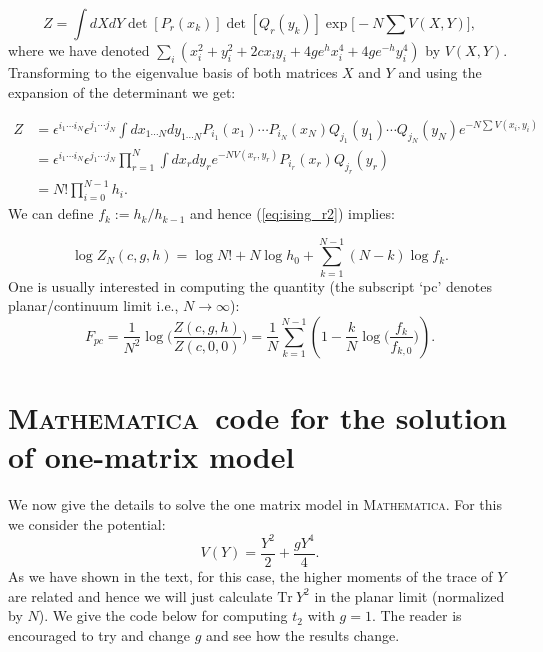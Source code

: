 \documentclass[11pt]{article}
\newcommand{\MA}{\textsc{Mathematica}}
\begin{document}
\begin{equation}
	Z = \int dX dY \det[P_{r}(x_k)] \det[Q_{r}(y_k)] \exp\Big[-N \sum V(X,Y)\Big], 
\end{equation}
where we have denoted $\sum_{i} (x_{i}^2 + y_{i}^{2} +2c x_{i}y_{i} + 4ge^{h}x_{i}^{4} + 4ge^{-h}y_{i}^4)$ by $V(X,Y)$. 
Transforming to the eigenvalue basis of both matrices $X$ and $Y$ and using the expansion of the determinant we get:

\begin{align}
	Z &= \epsilon^{i_1 \cdots i_N} \epsilon^{j_1 \cdots j_N} \int dx_{1 \cdots N}
	dy_{1 \cdots N} P_{i_{1}}(x_1) \cdots P_{i_{N}}(x_N)
	Q_{j_{1}}(y_1) \cdots Q_{j_{N}}(y_N)
	e^{-N \sum V(x_i,y_i)} \nonumber  \\  
	&= \epsilon^{i_1 \cdots i_N} \epsilon^{j_1 \cdots j_N} \prod_{r=1}^{N} \int dx_{r} dy_{r} e^{-N V(x_r, y_r)} P_{i_r}(x_r) Q_{j_r}(y_r) \nonumber  \\  
	&=  N! \prod_{i=0}^{N-1} h_{i}.  
	\label{eq:ising_r2}
\end{align}
We can define $f_{k} := h_k/h_{k-1}$ and hence 
(\ref{eq:ising_r2}) implies:

\begin{equation}
	\log Z_{N}(c,g,h) = \log N! + N \log h_0 + \sum_{k=1}^{N-1} (N-k) \log f_{k} . 
\end{equation}
One is usually interested in computing the quantity (the subscript `pc' denotes planar/continuum limit i.e., $ N \to \infty$):
\begin{equation}
	F_{pc} = \frac{1}{N^2} \log\Bigg( \frac{Z(c,g,h)}{Z(c,0,0)}\Bigg) = \frac{1}{N} \sum_{k=1}^{N-1} \left(1 - \frac{k}{N} \log \Big(\frac{f_k}{f_{k,0}}\Big)\right). 
\end{equation}

\section{\label{sec:math_code}\MA~code for the solution of one-matrix model}
We now give the details to solve the one matrix model in \MA. For this we consider the potential:
\[ V(Y) = \frac{Y^2}{2} + \frac{gY^4}{4}.\]
As we have shown in the text, for this case, the higher moments of the trace of $Y$ are related and hence we will just calculate $\mbox{Tr}~Y^2$ in the planar limit (normalized by $N$). We give the code below for computing $t_{2}$ with $g=1$. The reader is encouraged to try and change $g$ and see how the results change.
\end{document}
